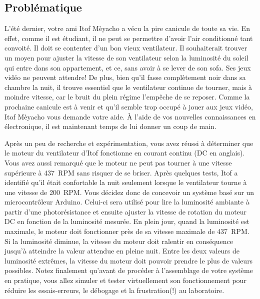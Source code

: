 \documentclass[english,french,12pt]{article}
\begin{document}
\subsection*{Problématique}
\vspace{-0.5em}
L’été dernier, votre ami Itof Mèyacho a vécu la pire canicule de toute sa vie. En effet, comme il est étudiant, il ne peut se permettre d’avoir l’air conditionné tant convoité. Il doit se contenter d’un bon vieux ventilateur. Il souhaiterait trouver un moyen pour ajuster la vitesse de son ventilateur selon la luminosité du soleil qui entre dans son appartement, et ce, sans avoir à se lever de son sofa. Ses jeux vidéo ne peuvent attendre! De plus, bien qu’il fasse complètement noir dans sa chambre la nuit, il trouve essentiel que le ventilateur continue de tourner, mais à moindre vitesse, car le bruit du plein régime l’empêche de se reposer. Comme la prochaine canicule est à venir et qu’il semble trop occupé à jouer aux jeux vidéo, Itof Mèyacho vous demande votre aide. À l'aide de vos nouvelles connaissances en électronique, il est maintenant temps de lui donner un coup de main.

Après un peu de recherche et expérimentation, vous avez réussi à déterminer que le moteur du ventilateur d’Itof fonctionne en courant continu (DC en anglais). Vous avez aussi remarqué que le moteur ne peut pas tourner à une vitesse supérieure à 437~RPM sans risquer de se briser. Après quelques tests, Itof a identifié qu’il était confortable la nuit seulement lorsque le ventilateur tourne à une vitesse de 200~RPM. Vous décidez donc de concevoir un système basé sur un microcontrôleur Arduino. Celui-ci sera utilisé pour lire la luminosité ambiante à partir d’une photorésistance et ensuite ajuster la vitesse de rotation du moteur DC en fonction de la luminosité mesurée. En plein jour, quand la luminosité est maximale, le moteur doit fonctionner près de sa vitesse maximale de 437~RPM. Si la luminosité diminue, la vitesse du moteur doit ralentir en conséquence jusqu’à atteindre la valeur attendue en pleine nuit. Entre les deux valeurs de luminosité extrêmes, la vitesse du moteur doit pouvoir prendre le plus de valeurs possibles. Notez finalement qu'avant de procéder à l’assemblage de votre système en pratique, vous allez simuler et tester virtuellement son fonctionnement pour réduire les essais-erreurs, le débogage et la frustration(!) au laboratoire.
\vspace{-1em}
\end{document}
